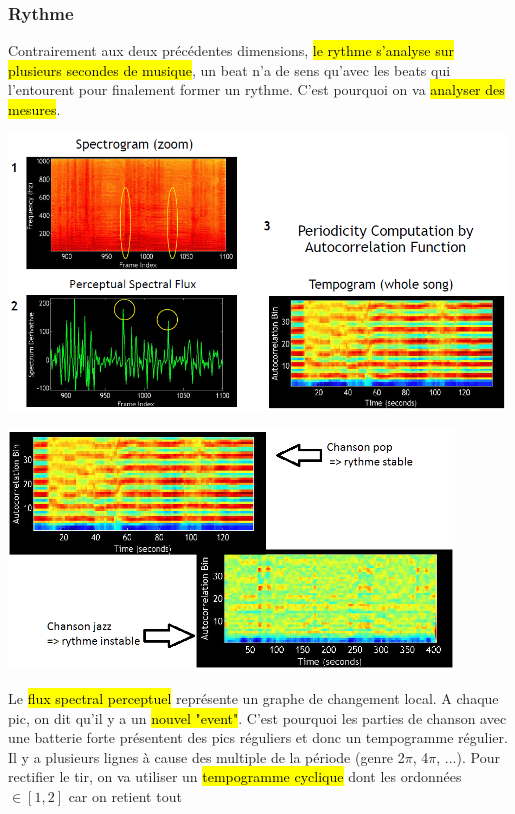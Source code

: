 \documentclass[letterpaper, 12pt]{article}
\newcommand{\alinea}{
\hspace*{0.5cm}}
\begin{document}
			\subsubsection{Rythme}
				\alinea Contrairement aux deux précédentes dimensions, \hl{le rythme s'analyse sur plusieurs secondes de musique}, un 
					beat n'a de sens qu'avec les beats qui l'entourent pour finalement former un rythme. C'est pourquoi on va 
					\hl{analyser des mesures}.
				\begin{center}
					\includegraphics[width=5.2in]{Images/tempo} 
				\end{center}
				\begin{center}
					\includegraphics[width=4.66in]{Images/tempo2}
				\end{center}
				\alinea Le \hl{flux spectral perceptuel} représente un graphe de changement local. A chaque pic, on dit qu'il y a un 
					\hl{nouvel "event"}. C'est pourquoi les parties de chanson avec une batterie forte présentent des pics réguliers et 
					donc un tempogramme régulier. Il y a plusieurs lignes à cause des multiple de la période (genre 2$\pi$, 4$\pi$, ...). 
					Pour rectifier le tir, on va utiliser un \hl{tempogramme cyclique} dont les ordonnées $\in [1, 2]$ car on retient tout 
\end{document}
